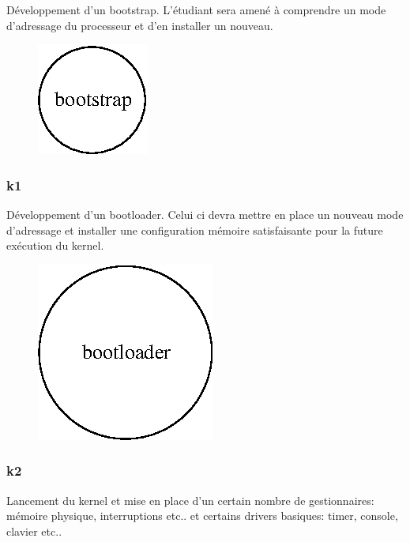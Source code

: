 \documentclass[10pt,a4wide]{article}
\begin{document}
D\'eveloppement d'un bootstrap. L'\'etudiant sera amen\'e \`a comprendre
un mode d'adressage du processeur et d'en installer un nouveau.

\vspace{5cm}

\begin{figure}[h]
\centerline{\includegraphics{figures/k0.eps}}
\end{figure}

\newpage

\subsubsection{k1}

D\'eveloppement d'un bootloader. Celui ci devra mettre en place un nouveau
mode d'adressage et installer une configuration m\'emoire satisfaisante pour
la future ex\'ecution du kernel.

\vspace{5cm}

\begin{figure}[h]
\centerline{\includegraphics{figures/k1.eps}}
\end{figure}

\newpage

\subsubsection{k2}

Lancement du kernel et mise en place d'un certain nombre de gestionnaires:
m\'emoire physique, interruptions etc.. et certains drivers basiques:
timer, console, clavier etc..
\end{document}
